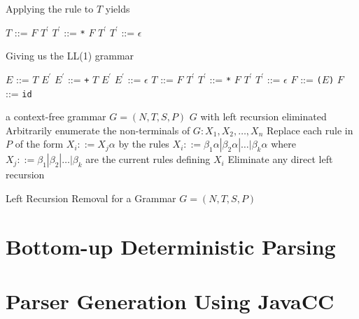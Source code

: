 \documentclass[8pt,a4paper,compress]{beamer}
\newcommand{\mm}[1]{$#1$}
\newcommand{\expo}[2]{$#1^{#2}$}
\newenvironment{spaced}
{
\smallskip
\hspace{.5cm}
\begin{minipage}[c]{\textwidth}
}
{
\end{minipage}
\smallskip
}
\begin{document}
\begin{frame}[fragile]
\pause

Applying the rule to $T$ yields

\text{ }
\begin{spaced}
\begin{production}
\mm{T}  ::= \mm{F} \expo{T}{\prime}
\expo{T}{\prime} ::= \lstinline{*} \mm{F} \expo{T}{\prime}
\expo{T}{\prime} ::= \mm{\epsilon}
\end{production}
\end{spaced}

\pause

Giving us the LL(1) grammar

\text{ }
\begin{spaced}
\begin{production}
\mm{E}  ::= \mm{T} \expo{E}{\prime}
\expo{E}{\prime} ::= \lstinline{+} \mm{T} \expo{E}{\prime}
\expo{E}{\prime} ::= \mm{\epsilon}
\mm{T}  ::= \mm{F} \expo{T}{\prime}
\expo{T}{\prime} ::= \lstinline{*} \mm{F} \expo{T}{\prime}
\expo{T}{\prime} ::= \mm{\epsilon}
\mm{F}  ::= \lstinline{(}\mm{E}\lstinline{)}
\mm{F}  ::= \lstinline{id}
\end{production}
\end{spaced}
\end{frame}

\begin{frame}[fragile]
\pause

\begin{algorithm}[H]
\begin{algorithmic}
\REQUIRE a context-free grammar $G=(N,T,S,P)$
\ENSURE $G$ with left recursion eliminated
\STATE Arbitrarily enumerate the non-terminals of $G: X_1, X_2, \dots, X_n$
\STATE Replace each rule in $P$ of the form $X_i::= X_j\alpha$ by the rules $X_i ::= \beta_1\alpha | \beta_2\alpha | \dots | \beta_k\alpha$ where $X_j ::= \beta_1 | \beta_2 | \dots | \beta_k$ are the current rules defining $X_i$
\STATE Eliminate any direct left recursion
\ENDFOR
\ENDFOR
\end{algorithmic}
\caption{Left Recursion Removal for a Grammar $G=(N,T,S,P)$}
\end{algorithm}
\end{frame}

\begin{frame}[fragile]
\pause

\end{frame}

\section{Bottom-up Deterministic Parsing}
\begin{frame}[fragile]
\pause

\end{frame}

\section{Parser Generation Using JavaCC}
\begin{frame}[fragile]
\pause

\end{frame}
\end{document}
